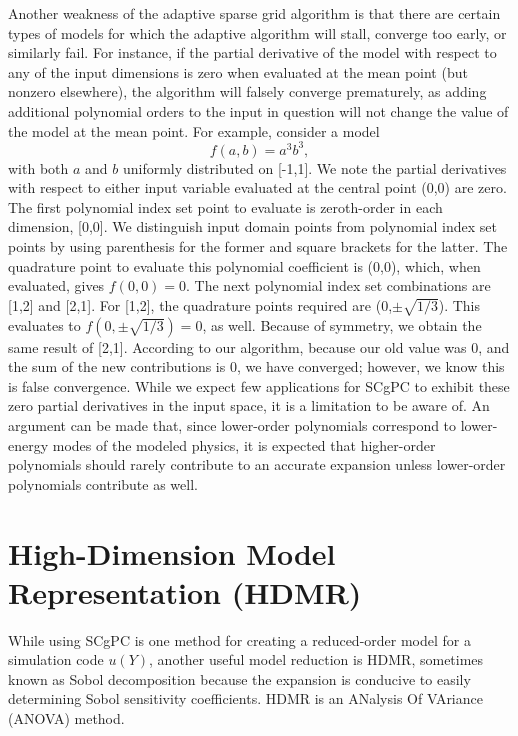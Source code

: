 Another weakness of the adaptive sparse grid algorithm is that 
there are certain types of models for which the adaptive algorithm will stall, converge too early, or
similarly fail.  For instance, if the partial derivative of the model with respect to any of the
input dimensions is zero when evaluated at the mean point (but nonzero elsewhere), the algorithm will falsely
converge prematurely, as adding additional polynomial orders to the input in question will not change the
value of the model at the mean point.  For example, consider a model
\begin{equation}
  f(a,b) = a^3b^3,
\end{equation}
with both $a$ and $b$ uniformly distributed on [-1,1].  We note the partial derivatives with respect to either
input variable evaluated at the central point (0,0) are zero.  The first polynomial index set point to
evaluate is zeroth-order in each dimension, [0,0].  We distinguish input domain points from polynomial index
set points by using parenthesis for the former and square brackets for the latter. The quadrature point to
evaluate this polynomial coefficient is (0,0), which, when evaluated, gives $f(0,0)=0$.  The next polynomial
index set combinations are [1,2] and [2,1].  For [1,2], the quadrature points required are
(0,$\pm\sqrt{1/3}$).  This evaluates to $f(0,\pm\sqrt{1/3})=0$, as well.  Because of symmetry, we obtain the
same result of [2,1].  According to our algorithm, because our old value was 0, and the sum of the new
contributions is 0, we have converged; however, we know this is false convergence.  While we expect few
applications for SCgPC to exhibit these zero partial derivatives in the input space, it is a limitation to be
aware of.  An argument can be made that, since lower-order polynomials correspond to lower-energy modes of the
modeled physics, it is expected that higher-order polynomials should rarely contribute to an accurate
expansion unless lower-order polynomials contribute as well.



\section{High-Dimension Model Representation (HDMR)}
While using SCgPC is one method for creating a reduced-order model for a simulation code $u(Y)$, another
useful model reduction is HDMR\cite{hdmr}, sometimes known as Sobol decomposition because the expansion is
conducive to easily determining Sobol sensitivity coefficients.  HDMR is an ANalysis Of VAriance (ANOVA)
method.

